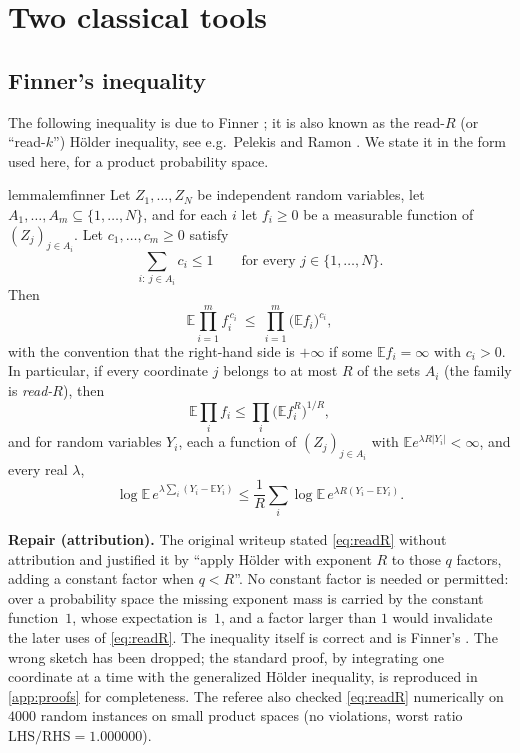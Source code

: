 \documentclass[11pt,a4paper]{article}
\theoremstyle{plain}
\theoremstyle{definition}
\theoremstyle{remark}
\newcommand{\EE}{\mathbb E}
\begin{document}
\section{Two classical tools}\label{sec:tools}

\subsection{Finner's inequality}

The following inequality is due to Finner \cite{Finner92}; it is also known as the read-$R$ (or ``read-$k$'') H\"older inequality, see e.g.\ Pelekis and Ramon \cite{PR17}. We state it in the form used here, for a product probability space.

\begin{restatable}{lemma}{lemfinner}\label{lem:finner}
Let $Z_1,\dots,Z_N$ be independent random variables, let $A_1,\dots,A_m\subseteq\{1,\dots,N\}$, and for each $i$ let $f_i\ge0$ be a measurable function of $(Z_j)_{j\in A_i}$. Let $c_1,\dots,c_m\ge0$ satisfy
\[
 \sum_{i:\ j\in A_i}c_i\le1\qquad\text{for every }j\in\{1,\dots,N\}.
\]
Then
\[
 \EE\prod_{i=1}^m f_i^{\,c_i}\ \le\ \prod_{i=1}^m\bigl(\EE f_i\bigr)^{c_i},
\]
with the convention that the right-hand side is $+\infty$ if some $\EE f_i=\infty$ with $c_i>0$. In particular, if every coordinate $j$ belongs to at most $R$ of the sets $A_i$ \textup{(}the family is \emph{read-$R$}\textup{)}, then
\begin{equation}\label{eq:readR}
 \EE\prod_i f_i\le\prod_i\bigl(\EE f_i^{R}\bigr)^{1/R},
\end{equation}
and for random variables $Y_i$, each a function of $(Z_j)_{j\in A_i}$ with $\EE e^{\lambda R|Y_i|}<\infty$, and every real $\lambda$,
\begin{equation}\label{eq:readRmgf}
 \log\EE\, e^{\lambda\sum_i(Y_i-\EE Y_i)}\le\frac1R\sum_i\log\EE\, e^{\lambda R(Y_i-\EE Y_i)}.
\end{equation}
\end{restatable}

\begin{repairbox}
\textbf{Repair (attribution).} The original writeup stated \eqref{eq:readR} without attribution and justified it by ``apply H\"older with exponent $R$ to those $q$ factors, adding a constant factor when $q<R$''. No constant factor is needed or permitted: over a probability space the missing exponent mass is carried by the constant function~$1$, whose expectation is~$1$, and a factor larger than $1$ would invalidate the later uses of \eqref{eq:readR}. The inequality itself is correct and is Finner's \cite{Finner92}. The wrong sketch has been dropped; the standard proof, by integrating one coordinate at a time with the generalized H\"older inequality, is reproduced in \cref{app:proofs} for completeness. The referee also checked \eqref{eq:readR} numerically on $4000$ random instances on small product spaces (no violations, worst ratio $\mathrm{LHS}/\mathrm{RHS}=1.000000$).
\end{repairbox}
\end{document}
